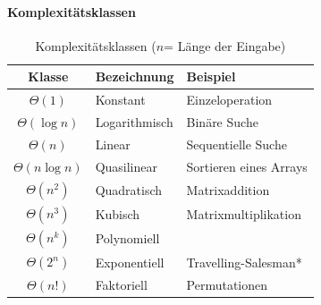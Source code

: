 \documentclass[
    ngerman,
    color=3b,
    dark_mode,
    load_common, %
    summary,
    boxarc,
]{rubos-tuda-template}
\begin{document}
\paragraph{Komplexitätsklassen}\mbox{}

\begin{table}[ht]
    \centering
    \renewcommand{\arraystretch}{1.2}
    \begin{tabular}{cll}
        \toprule
        Klasse            & Bezeichnung   & Beispiel               \\
        \midrule
        $\Theta(1)$       & Konstant      & Einzeloperation        \\
        $\Theta(\log n)$  & Logarithmisch & Binäre Suche           \\
        $\Theta(n)$       & Linear        & Sequentielle Suche     \\
        $\Theta(n\log n)$ & Quasilinear   & Sortieren eines Arrays \\
        $\Theta(n^2)$     & Quadratisch   & Matrixaddition         \\
        $\Theta(n^3)$     & Kubisch       & Matrixmultiplikation   \\
        $\Theta(n^k)$     & Polynomiell   &                        \\
        $\Theta(2^n)$     & Exponentiell  & Travelling-Salesman*   \\
        $\Theta(n!)$      & Faktoriell    & Permutationen          \\
        \bottomrule
    \end{tabular}
    \caption{Komplexitätsklassen ($n$= Länge der Eingabe)}
    \label{tab:komplexitaetsklassen}
\end{table}
\end{document}
